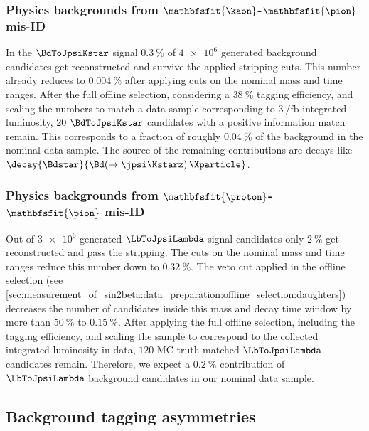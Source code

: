 \subsubsection{Physics backgrounds from $\mathbfsfit{\kaon}$-$\mathbfsfit{\pion}$ mis-ID}
\label{sec:measurement_of_sin2beta:physic_backgrounds:physic_backgrounds:kstar}

In the $\BdToJpsiKstar$ signal \MC $\SI{0.3}{\percent}$ of $\num{4e6}$ generated
background candidates get reconstructed and survive the applied stripping cuts.
This number already reduces to $\SI{0.004}{\percent}$ after applying cuts on the
nominal mass and time ranges. After the full offline selection, considering a
$\SI{38}{\percent}$ tagging efficiency, and scaling the numbers to match a data
sample corresponding to $\SI[separate-uncertainty=true]{3}{\per\femto\barn}$
integrated luminosity, $\num{20}$ $\BdToJpsiKstar$ candidates with a positive
\MC information match remain. This corresponds to a fraction of roughly
$\SI{0.04}{\percent}$ of the background in the nominal data sample. The source
of the remaining contributions are \eg decays like
$\decay{\Bdstar}{\Bd(\to\jpsi\Kstarz)\,\Xparticle}$.

\subsubsection{Physics backgrounds from $\mathbfsfit{\proton}$-$\mathbfsfit{\pion}$ mis-ID}
\label{sec:measurement_of_sin2beta:physic_backgrounds:physic_backgrounds:lambda}

Out of $\num{3e6}$ generated $\LbToJpsiLambda$ signal candidates only
$\SI{2}{\percent}$ get reconstructed and pass the stripping. The cuts on the
nominal mass and time ranges reduce this number down to $\SI{0.32}{\percent}$.
The veto cut applied in the offline selection (see
\cref{sec:measurement_of_sin2beta:data_preparation:offline_selection:daughters})
decreases the number of candidates inside this mass and decay time window by
more than $\SI{50}{\percent}$ to $\SI{0.15}{\percent}$. After applying the full
offline selection, including the tagging efficiency, and scaling the sample to
correspond to the collected integrated luminosity in data, $\num{120}$ MC
truth-matched $\LbToJpsiLambda$ candidates remain. Therefore, we expect a
$\SI{0.2}{\percent}$ contribution of $\LbToJpsiLambda$ background candidates in
our nominal data sample.

\subsection{Background tagging asymmetries}
\label{sec:measurement_of_sin2beta:physic_backgrounds:tagging_asymmetries}

